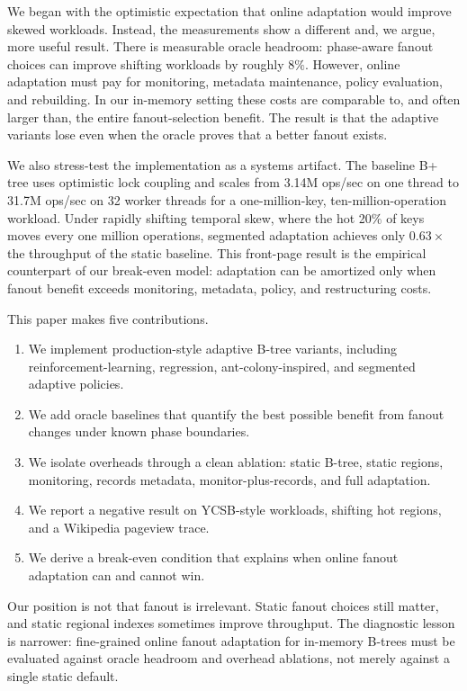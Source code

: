 \documentclass[sigconf,screen]{acmart}
\begin{document}
We began with the optimistic expectation that online adaptation would improve
skewed workloads.  Instead, the measurements show a different and, we argue,
more useful result.  There is measurable oracle headroom: phase-aware fanout
choices can improve shifting workloads by roughly \(8\%\).  However, online
adaptation must pay for monitoring, metadata maintenance, policy evaluation,
and rebuilding.  In our in-memory setting these costs are comparable to, and
often larger than, the entire fanout-selection benefit.  The result is that the
adaptive variants lose even when the oracle proves that a better fanout exists.

We also stress-test the implementation as a systems artifact.  The baseline
B+ tree uses optimistic lock coupling and scales from 3.14M ops/sec on one
thread to 31.7M ops/sec on 32 worker threads for a one-million-key,
ten-million-operation workload.  Under rapidly shifting temporal skew, where
the hot 20\% of keys moves every one million operations, segmented adaptation
achieves only \(0.63\times\) the throughput of the static baseline.  This
front-page result is the empirical counterpart of our break-even model:
adaptation can be amortized only when fanout benefit exceeds monitoring,
metadata, policy, and restructuring costs.

This paper makes five contributions.

\begin{enumerate}
  \item We implement production-style adaptive B-tree variants, including
  reinforcement-learning, regression, ant-colony-inspired, and segmented
  adaptive policies.
  \item We add oracle baselines that quantify the best possible benefit from
  fanout changes under known phase boundaries.
  \item We isolate overheads through a clean ablation: static B-tree, static
  regions, monitoring, records metadata, monitor-plus-records, and full
  adaptation.
  \item We report a negative result on YCSB-style workloads, shifting hot
  regions, and a Wikipedia pageview trace.
  \item We derive a break-even condition that explains when online fanout
  adaptation can and cannot win.
\end{enumerate}

Our position is not that fanout is irrelevant.  Static fanout choices still
matter, and static regional indexes sometimes improve throughput.  The
diagnostic lesson is narrower: fine-grained online fanout adaptation for
in-memory B-trees must be evaluated against oracle headroom and overhead
ablations, not merely against a single static default.
\end{document}
